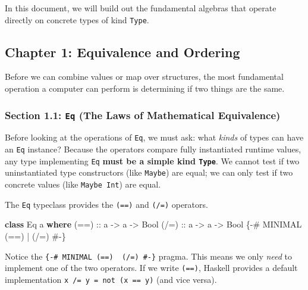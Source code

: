 \documentclass[
]{article}
\newenvironment{Shaded}{}{}
\newcommand{\DataTypeTok}[1]{\textcolor[rgb]{0.56,0.13,0.00}{#1}}
\newcommand{\KeywordTok}[1]{\textcolor[rgb]{0.00,0.44,0.13}{\textbf{#1}}}
\newcommand{\NormalTok}[1]{#1}
\newcommand{\OtherTok}[1]{\textcolor[rgb]{0.00,0.44,0.13}{#1}}
\begin{document}
In this document, we will build out the fundamental algebras that
operate directly on concrete types of kind \texttt{Type}.

\subsection{Chapter 1: Equivalence and
Ordering}\label{chapter-1-equivalence-and-ordering}

Before we can combine values or map over structures, the most
fundamental operation a computer can perform is determining if two
things are the same.

\subsubsection{\texorpdfstring{Section 1.1: \texttt{Eq} (The Laws of
Mathematical
Equivalence)}{Section 1.1: Eq (The Laws of Mathematical Equivalence)}}\label{section-1.1-eq-the-laws-of-mathematical-equivalence}

Before looking at the operations of \texttt{Eq}, we must ask: what
\emph{kinds} of types can have an \texttt{Eq} instance? Because the
operators compare fully instantiated runtime values, any type
implementing \texttt{Eq} \textbf{must be a simple kind \texttt{Type}}.
We cannot test if two uninstantiated type constructors (like
\texttt{Maybe}) are equal; we can only test if two concrete values (like
\texttt{Maybe\ Int}) are equal.

The \texttt{Eq} typeclass provides the \texttt{(==)} and \texttt{(/=)}
operators.

\begin{Shaded}
\begin{Highlighting}[]
\KeywordTok{class} \DataTypeTok{Eq}\NormalTok{ a }\KeywordTok{where}
\OtherTok{    (==) ::}\NormalTok{ a }\OtherTok{{-}\textgreater{}}\NormalTok{ a }\OtherTok{{-}\textgreater{}} \DataTypeTok{Bool}
\OtherTok{    (/=) ::}\NormalTok{ a }\OtherTok{{-}\textgreater{}}\NormalTok{ a }\OtherTok{{-}\textgreater{}} \DataTypeTok{Bool}
    \OtherTok{\{{-}\# MINIMAL (==) | (/=) \#{-}\}}
\end{Highlighting}
\end{Shaded}

Notice the \texttt{\{-\#\ MINIMAL\ (==)\ \textbar{}\ (/=)\ \#-\}}
pragma. This means we only \emph{need} to implement one of the two
operators. If we write \texttt{(==)}, Haskell provides a default
implementation \texttt{x\ /=\ y\ =\ not\ (x\ ==\ y)} (and vice versa).
\end{document}
